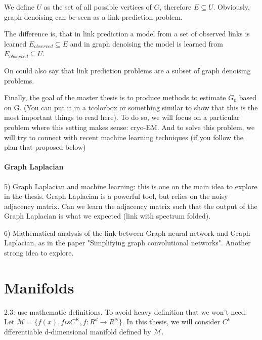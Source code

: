 We define $U$ as the set of all possible vertices of $G$, therefore $E \subseteq U$.
Obviously, graph denoising can be seen as a link prediction problem.

The difference is, that in link prediction a model from a set of observed links is learned
$E_{observed} \subseteq E$ and in graph denoising the model is learned from 
$E_{observed} \subseteq U$. 


\begin{tcolorbox}[colback=red!5!white,colframe=red!75!black]
    On could also say that link prediction problems are a subset of graph denoising problems.
\end{tcolorbox}



\begin{tcolorbox}[colback=red!5!white,colframe=red!75!black]
    Finally, the goal of the master thesis is to produce methods to estimate 
    $G_0$ based on G. 
    (You can put it in a tcolorbox or something similar to show that this is the most important things to read here). 
    To do so, we will focus on a particular problem where this setting makes sense: cryo-EM. And to solve this problem, we will try to connect with recent machine learning techniques
    (if you follow the plan that proposed below)
\end{tcolorbox}

\paragraph{Graph Laplacian}

\begin{tcolorbox}[colback=red!5!white,colframe=red!75!black]
    5) Graph Laplacian and machine learning: this is one on the main idea to explore in the thesis. 
Graph Laplacian is a powerful tool, but relies on the noisy adjacency matrix. 
Can we learn the adjacency matrix such that the output of the Graph Laplacian is what we expected (link with spectrum folded).

6) Mathematical analysis of the link between Graph neural network and Graph Laplacian, as in the paper "Simplifying graph convolutional networks". 
Another strong idea to explore.
\end{tcolorbox}

\section{Manifolds}
2.3: use mathematic definitions.
To avoid heavy definition that we won't need: 
Let $\mathcal{M} = \{ f(x), f is C^K, f: R^d \to R^N \}$. 
In this thesis, we will consider $C^k$ dfferentiable d-dimensional manifold defined by $\mathcal{M}$.

